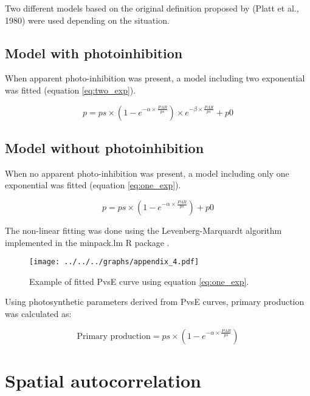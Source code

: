 \documentclass[12pt,a4paper]{scrartcl}
\begin{document}
Two different models based on the original definition proposed by (Platt et al., 1980) were used depending on the situation.

\subsection*{Model with photoinhibition}

When apparent photo-inhibition was present, a model including two exponential was fitted (equation \ref{eq:two_exp}).

\begin{equation}
	p = ps \times (1 - e^{-\alpha \times \frac{PAR}{ps}}) \times e^{-\beta \times \frac{PAR}{ps}} + p0
	\label{eq:two_exp}
\end{equation}

\subsection*{Model without photoinhibition}

When no apparent photo-inhibition was present, a model including only one exponential was fitted (equation \ref{eq:one_exp}).

\begin{equation}
	p = ps \times (1 - e^{-\alpha \times \frac{PAR}{ps}}) + p0
	\label{eq:one_exp}
\end{equation}

The non-linear fitting was done using the Levenberg-Marquardt algorithm implemented in the minpack.lm R package \citep{Elzhov2013}.

\begin{figure}[h]
	\centering
	\texttt{[image: ../../../graphs/appendix\_4.pdf]}
	\caption{Example of fitted PvsE curve using equation \ref{eq:one_exp}.}
\end{figure}

Using photosynthetic parameters derived from PvsE curves, primary production was calculated as:

\begin{equation}
	\text{Primary production} = ps \times (1 - e^{-\alpha \times \frac{PAR}{ps}})
	\label{eq:pp}
\end{equation}

%

\clearpage
\section*{Spatial autocorrelation}
\end{document}
